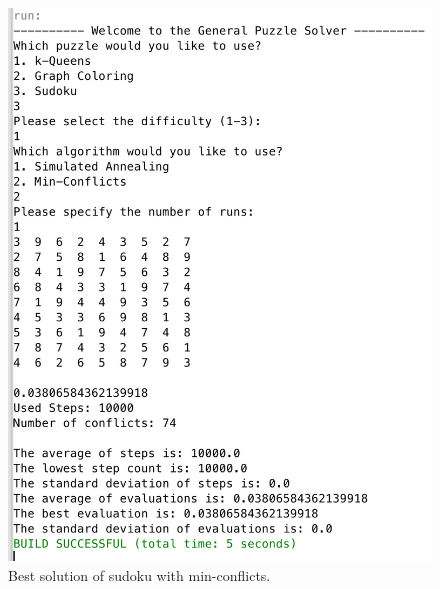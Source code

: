 \documentclass{scrartcl}
\begin{document}
  \begin{figure}[!htbp]
 \includegraphics[width=1.0\linewidth]{graphics/sudoku-mc.png}
\caption{Best solution of sudoku with min-conflicts.}\label{fig:sudoku-mc}
 \end{figure}

\pagebreak
\end{document}
